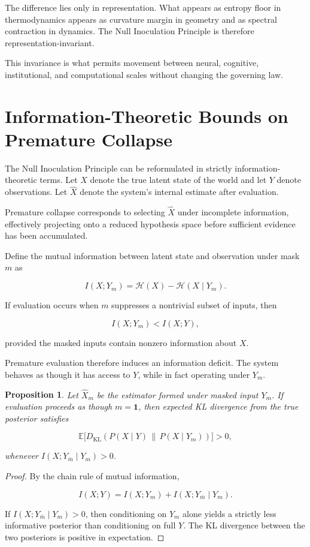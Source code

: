 \documentclass[11pt]{article}
\newtheorem{proposition}{Proposition}
\theoremstyle{remark}
\begin{document}
The difference lies only in representation. What appears as entropy floor in thermodynamics appears as curvature margin in geometry and as spectral contraction in dynamics. The Null Inoculation Principle is therefore representation-invariant.

This invariance is what permits movement between neural, cognitive, institutional, and computational scales without changing the governing law.

\section{Information-Theoretic Bounds on Premature Collapse}
\label{sec:information_bounds}

The Null Inoculation Principle can be reformulated in strictly information-theoretic terms. Let $X$ denote the true latent state of the world and let $Y$ denote observations. Let $\hat{X}$ denote the system's internal estimate after evaluation.

Premature collapse corresponds to selecting $\hat{X}$ under incomplete information, effectively projecting onto a reduced hypothesis space before sufficient evidence has been accumulated.

Define the mutual information between latent state and observation under mask $m$ as

\[
I(X; Y_m) = \mathcal{H}(X) - \mathcal{H}(X \mid Y_m).
\]

If evaluation occurs when $m$ suppresses a nontrivial subset of inputs, then

\[
I(X; Y_m) < I(X; Y),
\]

provided the masked inputs contain nonzero information about $X$.

Premature evaluation therefore induces an information deficit. The system behaves as though it has access to $Y$, while in fact operating under $Y_m$.

\begin{proposition}
Let $\hat{X}_m$ be the estimator formed under masked input $Y_m$. If evaluation proceeds as though $m = \mathbf{1}$, then expected KL divergence from the true posterior satisfies

\[
\mathbb{E}\big[D_{\mathrm{KL}}(P(X \mid Y) \,\|\, P(X \mid Y_m))\big] > 0,
\]

whenever $I(X; Y_{\bar m} \mid Y_m) > 0$.
\end{proposition}

\begin{proof}
By the chain rule of mutual information,

\[
I(X; Y) = I(X; Y_m) + I(X; Y_{\bar m} \mid Y_m).
\]

If $I(X; Y_{\bar m} \mid Y_m) > 0$, then conditioning on $Y_m$ alone yields a strictly less informative posterior than conditioning on full $Y$. The KL divergence between the two posteriors is positive in expectation.
\end{proof}
\end{document}

